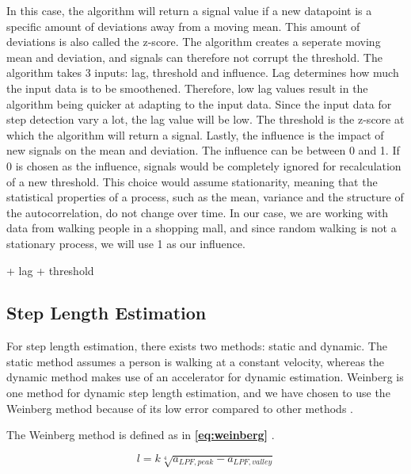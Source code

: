 In this case, the algorithm will return a signal value if a new datapoint is a specific amount of deviations away from a moving mean. This amount of deviations is also called the z-score. The algorithm creates a seperate moving mean and deviation, and signals can therefore not corrupt the threshold. The algorithm takes 3 inputs: lag, threshold and influence. Lag determines how much the input data is to be smoothened. Therefore, low lag values result in the algorithm being quicker at adapting to the input data. Since the input data for step detection vary a lot, the lag value will be low. The threshold is the z-score at which the algorithm will return a signal. Lastly, the influence is the impact of new signals on the mean and deviation. The influence can be between 0 and 1. If 0 is chosen as the influence, signals would be completely ignored for recalculation of a new threshold. This choice would assume stationarity, meaning that the statistical properties of a process, such as the mean, variance and the structure of the autocorrelation, do not change over time. In our case, we are working with data from walking people in a shopping mall, and since random walking is not a stationary process, we will use 1 as our influence. 

+ lag 
+ threshold





%


\subsection{Step Length Estimation}

For step length estimation, there exists two methods: static and dynamic. The static method assumes a person is walking at a constant velocity, whereas the dynamic method makes use of an accelerator for dynamic estimation. Weinberg is one method for dynamic step length estimation, and we have chosen to use the Weinberg method because of its low error compared to other methods \cite{HybridPositioningPaper}.

The Weinberg method is defined as in \textbf{\autoref{eq:weinberg}} \cite{weinberg}.

\begin{equation} \label{eq:weinberg}
    l = k \sqrt[4]{a_{LPF, peak} - a_{LPF, valley}}
\end{equation}

